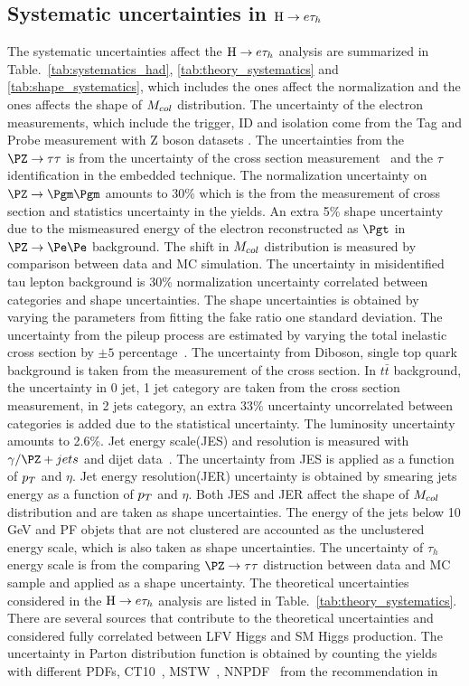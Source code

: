 \subsection{Systematic uncertainties in $\mathrm{H} \to e \tau_{h}$}

The systematic uncertainties affect the $\mathrm{H} \to e \tau_{h}$ analysis are summarized in Table.~\ref{tab:systematics_had}, \ref{tab:theory_systematics} and \ref{tab:shape_systematics}, which includes the ones affect the normalization and the ones affects the shape of $M_{col}$ distribution. The uncertainty of the electron measurements, which include the trigger, ID and isolation come from the Tag and Probe measurement with Z boson datasets \cite{CMS:2011aa,Khachatryan:2015dfa}. The uncertainties from the $\PZ \to \tau \tau$ is from the uncertainty of the cross section measurement~\cite{Chatrchyan:2014mua} and the $\tau$ identification in the embedded technique. The normalization uncertainty on $\PZ \to \Pgm \Pgm$ amounts to 30\% which is the from the measurement of cross section and statistics uncertainty in the yields. An extra 5\% shape uncertainty due to the mismeasured energy of the electron reconstructed as $\Pgt$ in $\PZ \to \Pe\Pe$ background.  The shift in $M_{col}$ distribution is measured by comparison between data and MC simulation. The uncertainty in misidentified tau lepton background is 30\% normalization uncertainty correlated between categories and shape uncertainties. The shape uncertainties is obtained by varying the parameters from fitting the fake ratio one standard deviation.   The uncertainty from the pileup process are estimated by varying the total inelastic cross section by $\pm5$ percentage~\cite{Chatrchyan:2012nj}. The uncertainty from Diboson, single top quark background is taken from the measurement of the cross section. In $t\bar{t}$ background, the uncertainty in 0 jet, 1 jet category are taken from the cross section measurement, in 2  jets category, an extra 33\% uncertainty uncorrelated between categories is added due to the statistical uncertainty. The luminosity uncertainty amounts to 2.6\%.  Jet energy scale(JES) and resolution is measured with $\gamma/\PZ+jets$ and dijet data~\cite{CMS-JME-10-011}. The uncertainty from JES is applied as a function of $p_{T}$ and $\eta$. Jet energy resolution(JER) uncertainty is obtained by smearing jets energy as a function of $p_{T}$ and $\eta$. Both JES and JER affect the shape of $M_{col}$ distribution and are taken as shape uncertainties. The energy of the jets below 10 GeV and PF objets that are not clustered are accounted as the unclustered energy scale, which is also taken as shape uncertainties. The uncertainty of $\tau_{h}$ energy scale is from the comparing $\PZ \to \tau\tau$ distruction between data and MC sample and applied as a shape uncertainty. The theoretical uncertainties considered in the $\mathrm{H} \to e \tau_{h}$ analysis are listed in Table.~\ref{tab:theory_systematics}. There are several sources that contribute to the theoretical uncertainties and considered fully correlated between LFV Higgs and SM Higgs production. The uncertainty in Parton distribution function is obtained by counting the yields with different PDFs,  CT10~\cite{Nadolsky:2008zw}, MSTW~\cite{Martin:2009iq}, NNPDF~\cite{Ball:2010de}  from the recommendation in 